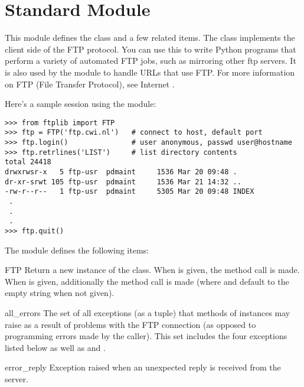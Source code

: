 \section{Standard Module }
\label{module-ftplib}


This module defines the class  and a few related items.  The
 class implements the client side of the FTP protocol.  You
can use this to write Python programs that perform a variety of
automated FTP jobs, such as mirroring other ftp servers.  It is also
used by the module  to handle URLs that use FTP.  For
more information on FTP (File Transfer Protocol), see Internet .

Here's a sample session using the  module:

\begin{verbatim}
>>> from ftplib import FTP
>>> ftp = FTP('ftp.cwi.nl')   # connect to host, default port
>>> ftp.login()               # user anonymous, passwd user@hostname
>>> ftp.retrlines('LIST')     # list directory contents
total 24418
drwxrwsr-x   5 ftp-usr  pdmaint     1536 Mar 20 09:48 .
dr-xr-srwt 105 ftp-usr  pdmaint     1536 Mar 21 14:32 ..
-rw-r--r--   1 ftp-usr  pdmaint     5305 Mar 20 09:48 INDEX
 .
 .
 .
>>> ftp.quit()
\end{verbatim}
%
The module defines the following items:

\begin{funcdesc}{FTP}{}
Return a new instance of the  class.  When
 is given, the method call  is
made.  When  is given, additionally the method call
 is made (where
 and  default to the empty string when not given).
\end{funcdesc}

\begin{datadesc}{all_errors}
The set of all exceptions (as a tuple) that methods of 
instances may raise as a result of problems with the FTP connection
(as opposed to programming errors made by the caller).  This set
includes the four exceptions listed below as well as
 and .
\end{datadesc}

\begin{excdesc}{error_reply}
Exception raised when an unexpected reply is received from the server.
\end{excdesc}

